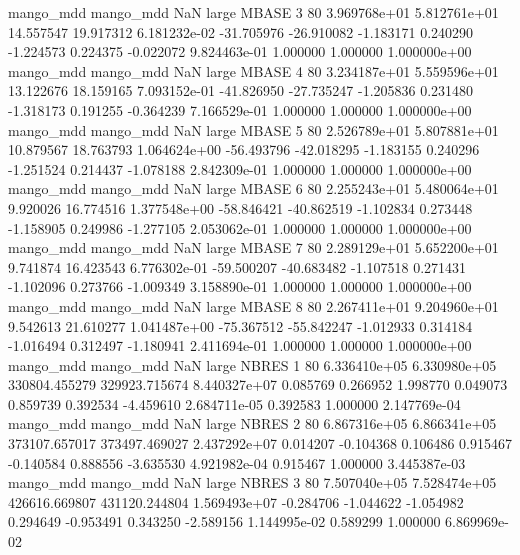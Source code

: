 mango_mdd mango_mdd                   NaN      large    MBASE                 3 80 3.969768e+01   5.812761e+01     14.557547      19.917312  6.181232e-02    -31.705976    -26.910082    -1.183171       0.240290 -1.224573   0.224375    -0.022072   9.824463e-01            1.000000        1.000000        1.000000e+00
mango_mdd mango_mdd                   NaN      large    MBASE                 4 80 3.234187e+01   5.559596e+01     13.122676      18.159165  7.093152e-01    -41.826950    -27.735247    -1.205836       0.231480 -1.318173   0.191255    -0.364239   7.166529e-01            1.000000        1.000000        1.000000e+00
mango_mdd mango_mdd                   NaN      large    MBASE                 5 80 2.526789e+01   5.807881e+01     10.879567      18.763793  1.064624e+00    -56.493796    -42.018295    -1.183155       0.240296 -1.251524   0.214437    -1.078188   2.842309e-01            1.000000        1.000000        1.000000e+00
mango_mdd mango_mdd                   NaN      large    MBASE                 6 80 2.255243e+01   5.480064e+01      9.920026      16.774516  1.377548e+00    -58.846421    -40.862519    -1.102834       0.273448 -1.158905   0.249986    -1.277105   2.053062e-01            1.000000        1.000000        1.000000e+00
mango_mdd mango_mdd                   NaN      large    MBASE                 7 80 2.289129e+01   5.652200e+01      9.741874      16.423543  6.776302e-01    -59.500207    -40.683482    -1.107518       0.271431 -1.102096   0.273766    -1.009349   3.158890e-01            1.000000        1.000000        1.000000e+00
mango_mdd mango_mdd                   NaN      large    MBASE                 8 80 2.267411e+01   9.204960e+01      9.542613      21.610277  1.041487e+00    -75.367512    -55.842247    -1.012933       0.314184 -1.016494   0.312497    -1.180941   2.411694e-01            1.000000        1.000000        1.000000e+00
mango_mdd mango_mdd                   NaN      large    NBRES                 1 80 6.336410e+05   6.330980e+05 330804.455279  329923.715674  8.440327e+07      0.085769      0.266952     1.998770       0.049073  0.859739   0.392534    -4.459610   2.684711e-05            0.392583        1.000000        2.147769e-04
mango_mdd mango_mdd                   NaN      large    NBRES                 2 80 6.867316e+05   6.866341e+05 373107.657017  373497.469027  2.437292e+07      0.014207     -0.104368     0.106486       0.915467 -0.140584   0.888556    -3.635530   4.921982e-04            0.915467        1.000000        3.445387e-03
mango_mdd mango_mdd                   NaN      large    NBRES                 3 80 7.507040e+05   7.528474e+05 426616.669807  431120.244804  1.569493e+07     -0.284706     -1.044622    -1.054982       0.294649 -0.953491   0.343250    -2.589156   1.144995e-02            0.589299        1.000000        6.869969e-02
